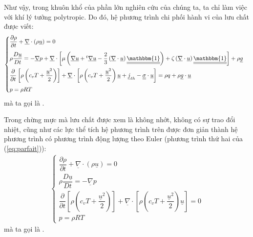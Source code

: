 Như vậy, trong khuôn khổ của phần lớn nghiên cứu của chúng ta, ta chỉ làm việc với khí lý tưởng polytropic. Do đó, hệ phương trình chi phối hành vi của lưu chất được viết:
    \begin{align}\label{eq:reel}
        \begin{cases}
            \dfrac{\partial\rho}{\partial t}+\underline{\nabla}\cdot\left(\rho\underline{u}\right)=0\\[10pt]
            \rho\dfrac{D\underline{u}}{Dt}=-\underline{\nabla}p+\underline{\nabla}\cdot\left[\mu\left(\underline{\nabla}\underline{u}+{}^t\underline{\nabla}\underline{u}-\dfrac{2}{3}\left(\underline{\nabla}\cdot\underline{u}\right)\underline{\underline{\mathbbm{1}}}\right)+\zeta\left(\underline{\nabla}\cdot\underline{u}\right)\underline{\underline{\mathbbm{1}}}\right]+\rho\underline{g}\\[10pt]
            \dfrac{\partial}{\partial t}\left[\rho\left(c_vT+\dfrac{\underline{u}^2}{2}\right)\right]+\underline{\nabla}\cdot\left[\rho\left(c_vT+\dfrac{\underline{u}^2}{2}\right)\underline{u}+\underline{j}_{th}-\underline{\underline{\sigma}}\cdot\underline{u}\right]=\rho q+\rho\underline{g}\cdot\underline{u}\\[10pt]
            p=\rho RT
        \end{cases}
    \end{align}
mà ta gọi là .

Trong chừng mực mà lưu chất được xem là không nhớt, không có sự trao đổi nhiệt, cũng như các lực thể tích hệ phương trình trên được đơn giản thành hệ phương trình có phương trình động lượng theo Euler (phương trình thứ hai của (\ref{eq:parfait})):
    \begin{align}\label{eq:parfait}
        \begin{cases}
            \dfrac{\partial\rho}{\partial t}+\underline{\nabla}\cdot\left(\rho \underline{u}\right)=0\\[10pt]
            \rho\dfrac{D\underline{u}}{Dt}=-\underline{\nabla}p\\[10pt]
            \dfrac{\partial}{\partial t}\left[\rho\left(c_vT+\dfrac{ \underline{u}^2}{2}\right)\right]+\underline{\nabla}\cdot\left[\rho\left(c_vT+\dfrac{\underline{u}^2}{2}\right)\underline{u} \right]=0\\[10pt]
            p=\rho RT
        \end{cases}
    \end{align}
mà ta gọi là .

